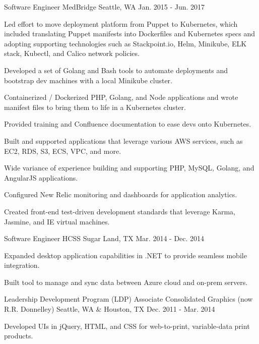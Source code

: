 \begin{cventries}

\cventry
{Software Engineer} %
{MedBridge} %
{Seattle, WA} %
{Jan. 2015 - Jun. 2017} %
{ %
\begin{cvitems}
\item {Led effort to move deployment platform from Puppet to Kubernetes, which included translating Puppet manifests into Dockerfiles and Kubernetes specs and  adopting supporting technologies such as Stackpoint.io, Helm, Minikube, ELK stack, Kubectl, and Calico network policies.}
\item {Developed a set of Golang and Bash tools to automate deployments and bootstrap dev machines with a local Minikube cluster.}
\item {Containerized / Dockerized PHP, Golang, and Node applications and wrote manifest files to bring them to life in a Kubernetes cluster.}
\item {Provided training and Confluence documentation to ease devs onto Kubernetes.}
\item {Built and supported applications that leverage various AWS services, such as EC2, RDS, S3, ECS, VPC, and more.}
\item {Wide variance of experience building and supporting PHP, MySQL, Golang, and AngularJS applications.}
\item {Configured New Relic monitoring and dashboards for application analytics.}
\item {Created front-end test-driven development standards that leverage Karma, Jasmine, and IE virtual machines.}
\end{cvitems} 
}


\cventry
{Software Engineer} %
{HCSS} %
{Sugar Land, TX} %
{Mar. 2014 - Dec. 2014} %
{ %
\begin{cvitems}
\item {Expanded desktop application capabilities in .NET to provide seamless mobile integration.}
\item {Built tool to manage and sync data between Azure cloud and on-prem servers.}
\end{cvitems}
}


\cventry
{Leadership Development Program (LDP) Associate} %
{Consolidated Graphics (now R.R. Donnelley)} %
{Seattle, WA \& Houston, TX} %
{Dec. 2011 - Mar. 2014} %
{ %
\begin{cvitems}
\item {Developed UIs in jQuery, HTML, and CSS for web-to-print, variable-data print products.}
\end{cvitems}
}

\end{cventries}
